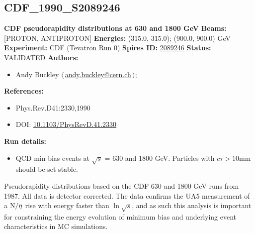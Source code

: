 \subsection[CDF\_1990\_S2089246]{CDF\_1990\_S2089246\,\cite{Abe:1989td}}
\textbf{CDF pseudorapidity distributions at 630 and 1800 GeV}\newline
\textbf{Beams:} [PROTON, ANTIPROTON] \newline
\textbf{Energies:} (315.0, 315.0); (900.0, 900.0) GeV \newline
\textbf{Experiment:} CDF (Tevatron Run 0) \newline
\textbf{Spires ID:} \href{http://www.slac.stanford.edu/spires/find/hep/www?rawcmd=key+2089246}{2089246}\newline
\textbf{Status:} VALIDATED\newline
\textbf{Authors:}
\begin{itemize}
  \item Andy Buckley $\langle\,$\href{mailto:andy.buckley@cern.ch}{andy.buckley@cern.ch}$\,\rangle$;
\end{itemize}
\textbf{References:}
\begin{itemize}
  \item Phys.Rev.D41:2330,1990
  \item DOI: \href{http://dx.doi.org/10.1103/PhysRevD.41.2330}{10.1103/PhysRevD.41.2330}
\end{itemize}
\textbf{Run details:}
\begin{itemize}

  \item QCD min bias events at \ensuremath{\sqrt{s}} = 630 and 1800 GeV. Particles with $c \tau > 10$mm should be set stable.\end{itemize}

\noindent Pseudorapidity distributions based on the CDF 630 and 1800 GeV runs from 1987. All data is detector corrected. The data confirms the UA5 measurement of a $\d{N}/\d{\eta}$ rise with energy faster than $\ln{\sqrt{s}}$, and as such this analysis is important for constraining the energy evolution of minimum bias and underlying event characteristics in MC simulations.

\clearpage


\clearpage

